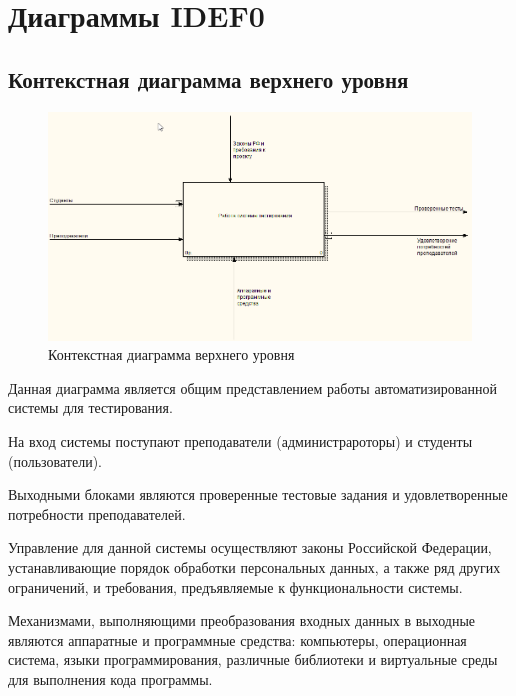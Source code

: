 \section{Диаграммы IDEF0}
    \subsection{Контекстная диаграмма верхнего уровня}
    \begin{figure}[H]
        \includegraphics[width=\textwidth, center]{../img/idef0/idef0_context.png}
        \caption{Контекстная диаграмма верхнего уровня}
    \end{figure}

    Данная диаграмма является общим представлением работы автоматизированной
    системы для тестирования.

    На вход системы поступают преподаватели (администрароторы) и студенты
    (пользователи).

    Выходными блоками являются проверенные тестовые задания и удовлетворенные
    потребности преподавателей.

    Управление для данной системы осуществляют законы Российской Федерации,
    устанавливающие порядок обработки персональных данных, а также ряд других
    ограничений, и требования, предъявляемые к функциональности системы.

    Механизмами, выполняющими преобразования входных данных в выходные являются
    аппаратные и программные средства: компьютеры, операционная система,
    языки программирования, различные библиотеки и виртуальные среды для
    выполнения кода программы.

